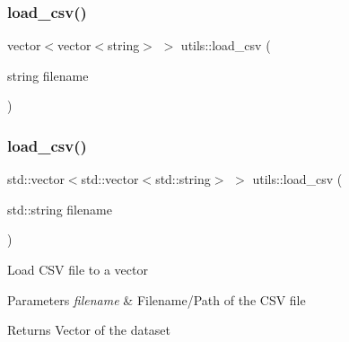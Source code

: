 \subsubsection{\texorpdfstring{load\+\_\+csv()}{load\_csv()}\hspace{0.1cm}{\footnotesize\ttfamily [1/2]}}
{\footnotesize\ttfamily vector$<$vector$<$string$>$ $>$ utils\+::load\+\_\+csv (\begin{DoxyParamCaption}\item[{string}]{filename }\end{DoxyParamCaption})}

\mbox{\label{namespaceutils_a5c44fc482aedf83775742090d60858f6}} 
\subsubsection{\texorpdfstring{load\+\_\+csv()}{load\_csv()}\hspace{0.1cm}{\footnotesize\ttfamily [2/2]}}
{\footnotesize\ttfamily std\+::vector$<$std\+::vector$<$std\+::string$>$ $>$ utils\+::load\+\_\+csv (\begin{DoxyParamCaption}\item[{std\+::string}]{filename }\end{DoxyParamCaption})}

Load C\+SV file to a vector 
\begin{DoxyParams}{Parameters}
{\em filename} & Filename/\+Path of the C\+SV file \\
\hline
\end{DoxyParams}
\begin{DoxyReturn}{Returns}
Vector of the dataset 
\end{DoxyReturn}
